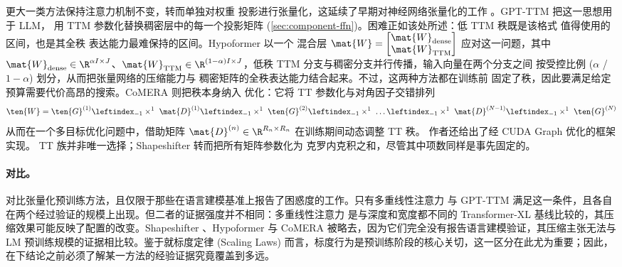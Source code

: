 更大一类方法保持注意力机制不变，转而单独对权重
投影进行张量化，这延续了早期对神经网络张量化的工作
\cite{novikov2015tensorizing}。GPT-TTM \cite{chekalina2023ttm} 把这一思想用于 LLM，
用 TTM 参数化替换稠密层中的每一个投影矩阵
(\cref{sec:component-ffn})。困难正如该处所述：低 TTM 秩既是该格式
值得使用的区间，也是其全秩
表达能力最难保持的区间。Hypoformer \cite{li2022hypoformer} 以一个
混合层 $\mat{W} = \begin{bmatrix} \mat{W}_{\rm dense} \\ \mat{W}_{\rm TTM}  \end{bmatrix}$ 应对这一问题，其中 $\mat{W}_{\rm dense} \in \R^{\alpha I \times J}$、$\mat{W}_{\rm TTM} \in \R^{(1-\alpha)I \times J}$，低秩 TTM
分支与稠密分支并行传播，输入向量在两个分支之间
按受控比例 ($\alpha$ / $1 - \alpha$) 划分，从而把张量网络的压缩能力与
稠密矩阵的全秩表达能力结合起来。不过，这两种方法都在训练前
固定了秩，因此要满足给定预算需要代价高昂的搜索。CoMERA \cite{yang2024comera} 则把秩本身纳入
优化：它将 TT 参数化与对角因子交错排列
\begin{equation*}
  \ten{W} = \ten{G}^{(1)} \leftindex_{-1} \times^1 ~ \mat{D}^{(1)} \leftindex_{-1} \times^1 ~ \ten{G}^{(2)} \leftindex_{-1} \times^1 ~ \dots \leftindex_{-1} \times^1 ~ \mat{D}^{(N - 1)} \leftindex_{-1} \times^1 ~ \ten{G}^{(N)}
\end{equation*}
从而在一个多目标优化问题中，借助矩阵 $\mat{D}^{(n)} \in \R^{R_{n} \times R_{n}}$ 在训练期间动态调整 TT 秩。
作者还给出了经 CUDA Graph 优化的框架实现。
TT 族并非唯一选择；Shapeshifter \cite{pahani2021shapeshifter} 转而把所有矩阵参数化为
克罗内克积之和，尽管其中项数同样是事先固定的。

\paragraph{对比。} 
 对比张量化预训练方法，且仅限于那些在语言建模基准上报告了困惑度的工作。只有多重线性注意力 \cite{ma2019tensorized} 与 GPT-TTM \cite{chekalina2023ttm} 满足这一条件，且各自在两个经过验证的规模上出现。但二者的证据强度并不相同：多重线性注意力 \cite{ma2019tensorized} 是与深度和宽度都不同的 Transformer-XL 基线比较的，其压缩效果可能反映了配置的改变。Shapeshifter \cite{pahani2021shapeshifter}、Hypoformer \cite{li2022hypoformer} 与 CoMERA \cite{yang2024comera} 被略去，因为它们完全没有报告语言建模验证，其压缩主张无法与 LM 预训练规模的证据相比较。鉴于就标度定律 (Scaling Laws) \cite{kaplan2020scalinglaws} 而言，标度行为是预训练阶段的核心关切，这一区分在此尤为重要；因此，在下结论之前必须了解某一方法的经验证据究竟覆盖到多远。


